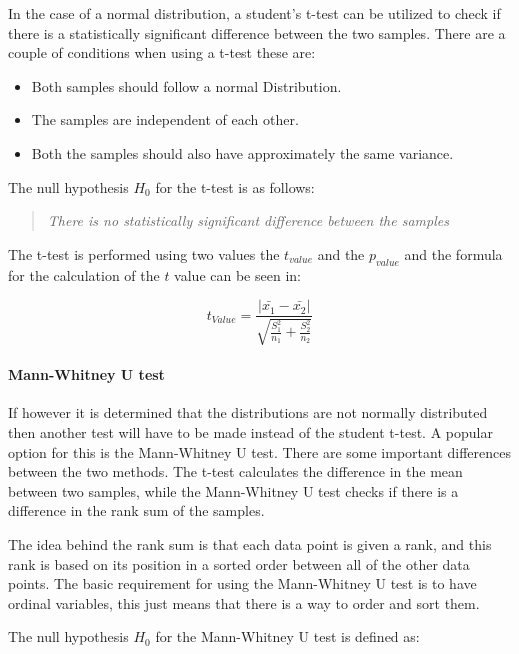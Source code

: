 In the case of a normal distribution, a student's t-test can be utilized to check if there is a statistically significant difference between the two samples. There are a couple of conditions when using a t-test these are:

\begin{itemize}
    \item Both samples should follow a normal Distribution.
    \item The samples are independent of each other.
    \item Both the samples should also have approximately the same variance.
\end{itemize}

The null hypothesis $H_0$ for the t-test is as follows:

\begin{quote}
    \textit{There is no statistically significant difference between the samples}    
\end{quote}

The t-test is performed using two values the $t_{value}$ and the $p_{value}$ and the formula for the calculation of the $t$ value can be seen in:

\begin{equation}
    t_{Value} = \frac{|\bar{x_1}- \bar{x_2}|}{\sqrt{\frac{S_1^2}{n_1} + \frac{S_2^2}{n_2}}}  
\end{equation}

\paragraph{Mann-Whitney U test}
If however it is determined that the distributions are not normally distributed then another test will have to be made instead of the student t-test. A popular option for this is the Mann-Whitney U test. There are some important differences between the two methods. The t-test calculates the difference in the mean between two samples, while the Mann-Whitney U test checks if there is a difference in the rank sum of the samples\cite{mann1947test}. 

The idea behind the rank sum is that each data point is given a rank, and this rank is based on its position in a sorted order between all of the other data points. 
The basic requirement for using the Mann-Whitney U test is to have ordinal variables, this just means that there is a way to order and sort them.

The null hypothesis $H_0$ for the Mann-Whitney U test is defined as:

